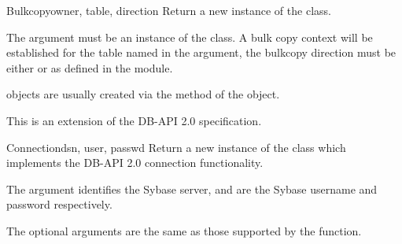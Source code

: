 \begin{classdesc}{Bulkcopy}{owner, table, direction}
Return a new instance of the  class.

The  argument must be an instance of the 
class.  A bulk copy context will be established for the table named in
the  argument, the bulkcopy direction must be either
 or  as defined in the
 module.

 objects are usually created via the
 method of the  object.

This is an extension of the DB-API 2.0 specification.
\end{classdesc}

\begin{classdesc}{Connection}{dsn, user, passwd \optional{, \ldots}}
Return a new instance of the  class which implements
the DB-API 2.0 connection functionality.

The  argument identifies the Sybase server,  and
 are the Sybase username and password respectively.

The optional arguments are the same as those supported by the
 function.
\end{classdesc}

